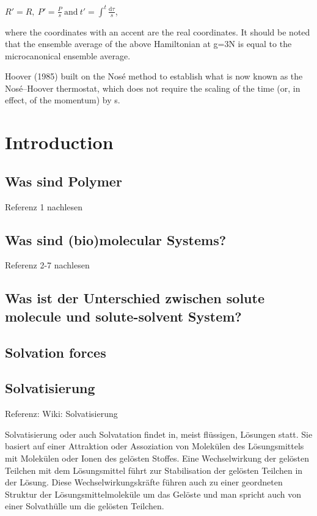 \documentclass[]{article}
\begin{document}
$R'=R,~ P'=\frac{P}{s} ~\text{and}~t'=\int^t \frac{\mathrm{d}\tau}{s}$,

where the coordinates with an accent are the real coordinates. It should be noted that the ensemble average of the above Hamiltonian at g=3N is equal to the microcanonical ensemble average.

Hoover (1985) built on the Nosé method to establish what is now known as the Nosé–Hoover thermostat, which does not require the scaling of the time (or, in effect, of the momentum) by s.

\section{Introduction}

\subsection{Was sind Polymer}
Referenz 1 nachlesen

\subsection{Was sind (bio)molecular Systems?}
Referenz 2-7 nachlesen

\subsection{Was ist der Unterschied zwischen solute molecule und solute-solvent System?}

\subsection{Solvation forces}
\subsection{Solvatisierung}
Referenz: Wiki: Solvatisierung

Solvatisierung oder auch Solvatation findet in, meist flüssigen, Lösungen statt. Sie basiert auf einer Attraktion oder Assoziation von Molekülen des Lösungsmittels mit Molekülen oder Ionen des gelösten Stoffes. Eine Wechselwirkung der gelösten Teilchen mit dem Lösungsmittel führt zur Stabilisation der gelösten Teilchen in der Lösung. Diese Wechselwirkungskräfte führen auch zu einer geordneten Struktur der Lösungsmittelmoleküle um das Gelöste und man spricht auch von einer Solvathülle um die gelösten Teilchen.
\end{document}
